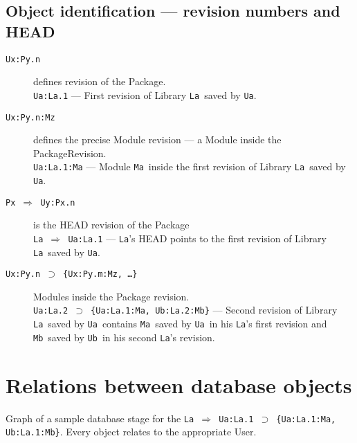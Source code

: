 \documentclass[10pt]{article}
\def\Ua{{\tt Ua}}
\def\Ub{{\tt Ub}}
\def\La{{\tt La}}
\def\Ma{{\tt Ma}}
\def\Mb{{\tt Mb}}
\def\headsto{${\Longrightarrow}$ }
\def\hto{\headsto}
\def\eq{${\supset}$ }
\begin{document}
	\subsection{Object identification --- revision numbers and HEAD}
	\begin{description}
		\item[{\tt Ux:Py.n}] defines revision of the Package.\\ 
			{\tt Ua:La.1} --- First revision of Library \La\ saved by \Ua.
		\item[{\tt Ux:Py.n:Mz}] defines the precise Module revision --- a Module inside the PackageRevision. \\ 
			{\tt Ua:La.1:Ma} --- Module \Ma\ inside the first revision of Library \La\ saved by \Ua.
		\item[{\tt Px \hto  Uy:Px.n}] is the HEAD revision of the Package\\ 
			{\tt La \hto  Ua:La.1} --- \La's HEAD points to the first revision of Library \La\ saved by \Ua.
		\item[{\tt Ux:Py.n \eq \{Ux:Py.m:Mz, \ldots\}}] Modules inside the Package revision.\\ 
			{\tt Ua:La.2 \eq \{Ua:La.1:Ma, Ub:La.2:Mb\}} --- Second revision of Library \La\ saved by 
			\Ua\ contains \Ma\ saved by \Ua\ in his \La's first revision and \Mb\ saved by \Ub\ in his 
			second \La's revision.
	\end{description}

\section{Relations between database objects}
	Graph of a sample database stage for the {\tt La \hto Ua:La.1 \eq \{Ua:La.1:Ma, Ub:La.1:Mb\}}. Every object 
	relates to the appropriate User.
	
\end{document}
